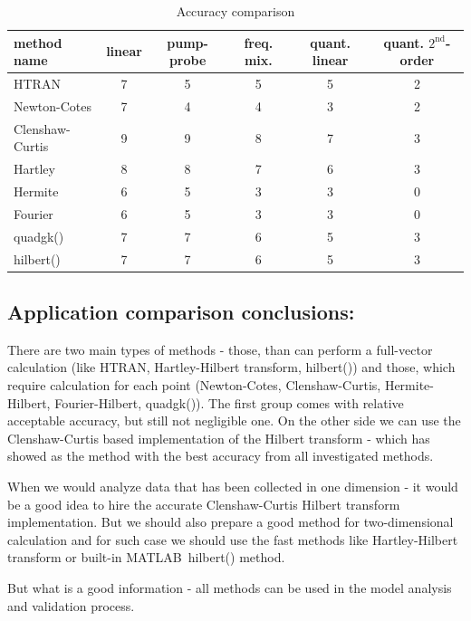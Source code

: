 \documentclass[12pt,twoside,a4paper]{article}
\numberwithin{equation}{subsection}
\numberwithin{figure}{subsection}
\begin{document}
\begin{table}
  \caption{Accuracy comparison} \label{gencom_accuracy} 
  \begin{tabular}{l | c | c | c | c | c}
    method name  &  linear  &  pump-probe  &  freq. mix.  &  quant. linear  &  quant. $2^{\text{nd}}$-order \\
    \hline
    HTRAN            &  7  &  5  &  5  &  5  &  2  \\
    Newton-Cotes     &  7  &  4  &  4  &  3  &  2  \\
    Clenshaw-Curtis  &  9  &  9  &  8  &  7  &  3  \\
    Hartley          &  8  &  8  &  7  &  6  &  3  \\
    Hermite          &  6  &  5  &  3  &  3  &  0  \\
    Fourier          &  6  &  5  &  3  &  3  &  0  \\
    quadgk()         &  7  &  7  &  6  &  5  &  3  \\
    hilbert()        &  7  &  7  &  6  &  5  &  3  \\
    \hline
  \end{tabular}
\end{table}


\subsection{Application comparison conclusions:} \label{chap:gencom_application}


There are two main types of methods - those, than can perform a full-vector calculation (like HTRAN, Hartley-Hilbert transform, hilbert()) and those, which require calculation for each point (Newton-Cotes, Clenshaw-Curtis, Hermite-Hilbert, Fourier-Hilbert, quadgk()). The first group comes with relative acceptable accuracy, but still not negligible one. On the other side we can use the Clenshaw-Curtis based implementation of the Hilbert transform - which has showed as the method with the best accuracy from all investigated methods.

When we would analyze data that has been collected in one dimension - it would be a good idea to hire the accurate Clenshaw-Curtis Hilbert transform implementation. But we should also prepare a good method for two-dimensional calculation and for such case we should use the fast methods like Hartley-Hilbert transform or built-in MATLAB~\textregistered hilbert() method.

But what is a good information - all methods can be used in the model analysis and validation process.
\end{document}
